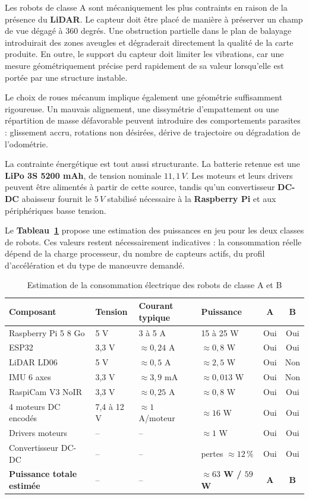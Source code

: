 \documentclass[11pt,a4paper]{report}
\newcommand{\kw}[1]{\textbf{#1}}
\begin{document}
Les robots de classe A sont mécaniquement les plus contraints en raison de la présence du \kw{LiDAR}. Le capteur doit être placé de manière à préserver un champ de vue dégagé à 360 degrés. Une obstruction partielle dans le plan de balayage introduirait des zones aveugles et dégraderait directement la qualité de la carte produite. En outre, le support du capteur doit limiter les vibrations, car une mesure géométriquement précise perd rapidement de sa valeur lorsqu’elle est portée par une structure instable.

Le choix de roues mécanum implique également une géométrie suffisamment rigoureuse. Un mauvais alignement, une dissymétrie d’empattement ou une répartition de masse défavorable peuvent introduire des comportements parasites : glissement accru, rotations non désirées, dérive de trajectoire ou dégradation de l’odométrie.

La contrainte énergétique est tout aussi structurante. La batterie retenue est une \kw{LiPo 3S 5200 mAh}, de tension nominale \(11{,}1\,V\). Les moteurs et leurs drivers peuvent être alimentés à partir de cette source, tandis qu’un convertisseur \kw{DC-DC} abaisseur fournit le \(5\,V\) stabilisé nécessaire à la \kw{Raspberry Pi} et aux périphériques basse tension.

Le \kw{Tableau~\ref{tab:consommation_classes}} propose une estimation des puissances en jeu pour les deux classes de robots. Ces valeurs restent nécessairement indicatives : la consommation réelle dépend de la charge processeur, du nombre de capteurs actifs, du profil d’accélération et du type de manœuvre demandé.

\begin{table}[H]
\centering
\small
\begin{tabular}{|p{4.8cm}|p{2.6cm}|p{2.4cm}|p{2.3cm}|c|c|}
\hline
\textbf{Composant} & \textbf{Tension} & \textbf{Courant typique} & \textbf{Puissance} & \textbf{A} & \textbf{B} \\
\hline
Raspberry Pi 5 8 Go & 5 V & 3 à 5 A & 15 à 25 W & Oui & Oui \\
\hline
ESP32 & 3,3 V & $\approx 0,24$ A & $\approx 0,8$ W & Oui & Oui \\
\hline
LiDAR LD06 & 5 V & $\approx 0,5$ A & $\approx 2,5$ W & Oui & Non \\
\hline
IMU 6 axes & 3,3 V & $\approx 3,9$ mA & $\approx 0,013$ W & Oui & Non \\
\hline
RaspiCam V3 NoIR & 3,3 V & $\approx 0,25$ A & $\approx 0,8$ W & Oui & Oui \\
\hline
4 moteurs DC encodés & 7,4 à 12 V & $\approx 1$ A/moteur & $\approx 16$ W & Oui & Oui \\
\hline
Drivers moteurs & -- & -- & $\approx 1$ W & Oui & Oui \\
\hline
Convertisseur DC-DC & -- & -- & pertes $\approx 12\,\%$ & Oui & Oui \\
\hline
\textbf{Puissance totale estimée} & -- & -- & \textbf{$\approx 63$ W / $59$ W} & \textbf{A} & \textbf{B} \\
\hline
\end{tabular}
\caption{Estimation de la consommation électrique des robots de classe A et B}
\label{tab:consommation_classes}
\end{table}
\end{document}
